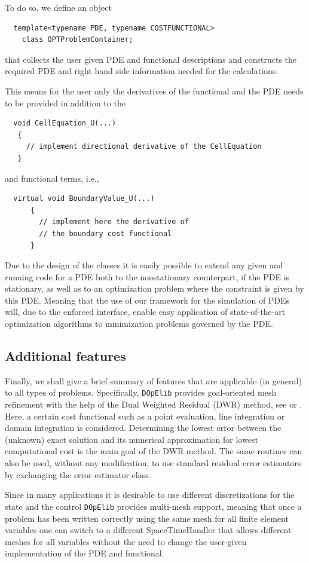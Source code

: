 \documentclass[prodmode,acmtoms]{acmsmall}
\numberwithin{equation}{section}
\newcommand{\dope}{\texttt{DOpElib}}
\begin{document}
To do so, we define an object 
\begin{lstlisting} 
  template<typename PDE, typename COSTFUNCTIONAL>
    class OPTProblemContainer;
\end{lstlisting}
that collects the user given PDE and functional descriptions and constructs the 
required PDE and right hand side information needed for the calculations.

This means for the user only the derivatives of the functional and the PDE 
needs to be provided in addition to the 
\begin{lstlisting} 
  void CellEquation_U(...)
   {
     // implement directional derivative of the CellEquation
   }
\end{lstlisting}
and functional terms, i.e.,     
\begin{lstlisting} 
  virtual void BoundaryValue_U(...)
      {
        // implement here the derivative of 
        // the boundary cost functional
      }
\end{lstlisting}

Due to the design of the classes it is easily possible to extend any given 
and running code for a PDE both to the nonstationary counterpart, if the PDE is 
stationary, as well as to an optimization problem where the constraint is 
given by this PDE. Meaning that the use of our framework for the simulation of 
PDEs will, due to the enforced interface, enable easy application of state-of-the-art 
optimization algorithms to minimization problems governed by the PDE.


\subsection{Additional features}
Finally, we shall give a brief summary of features 
that are applicable (in general) to all types of problems. Specifically,
\dope{} provides goal-oriented mesh refinement with the help of the 
Dual Weighted Residual (DWR) method, see \cite{BeRa96} or \cite{BR03}. Here, a certain 
cost functional such as a point evaluation, line integration or domain
integration is considered. Determining the lowest error between the 
(unknown) exact solution and its numerical approximation for lowest computational
cost is the main goal of the DWR method. The same routines 
can also be used, without any modification, to use standard residual error estimators by exchanging the 
error estimator class.

Since in many applications it is desirable to use different discretizations
for the state and the control \dope{} provides multi-mesh support, meaning that
once a problem has been written correctly using the same mesh for all finite element
variables one can switch to a different SpaceTimeHandler that allows different meshes for all 
variables without the need to change the user-given implementation of the PDE and functional.
\end{document}
